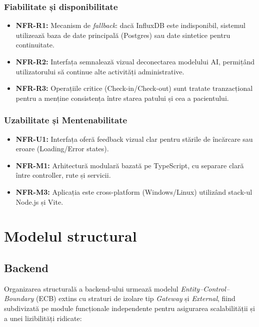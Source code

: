 \subsubsection{Fiabilitate și disponibilitate}
\begin{itemize}[noitemsep]
    \item \textbf{NFR-R1:} Mecanism de \textit{fallback}: dacă InfluxDB este indisponibil, sistemul utilizează baza de date principală (Postgres) sau date sintetice pentru continuitate.
    \item \textbf{NFR-R2:} Interfața semnalează vizual deconectarea modelului AI, permițând utilizatorului să continue alte activități administrative.
    \item \textbf{NFR-R3:} Operațiile critice (Check-in/Check-out) sunt tratate tranzacțional pentru a menține consistența între starea patului și cea a pacientului.
\end{itemize}

\subsubsection{Uzabilitate și Mentenabilitate}
\begin{itemize}[noitemsep]
    \item \textbf{NFR-U1:} Interfața oferă feedback vizual clar pentru stările de încărcare sau eroare (Loading/Error states).
    \item \textbf{NFR-M1:} Arhitectură modulară bazată pe TypeScript, cu separare clară între controller, rute și servicii.
    \item \textbf{NFR-M3:} Aplicația este cross-platform (Windows/Linux) utilizând stack-ul Node.js și Vite.
\end{itemize}

\section{Modelul structural}
\label{sec:model-structural}

\subsection*{Backend}
\label{subsec:model-structural-backend}

Organizarea structurală a backend-ului urmează modelul \textit{Entity--Control--Boundary} (ECB) extins cu straturi de izolare tip \textit{Gateway} și \textit{External}, fiind subdivizată pe module funcționale independente pentru asigurarea scalabilității și a unei lizibilități ridicate:


